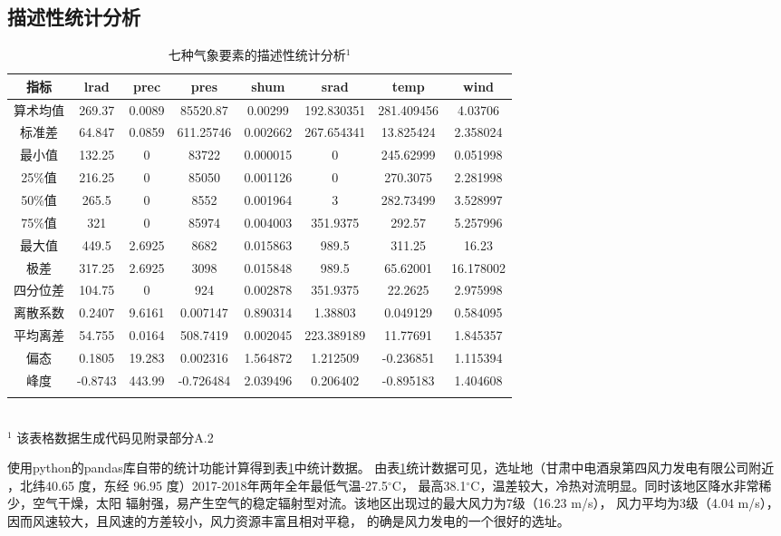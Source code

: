 \documentclass[AutoFakeBold]{LZUThesis}
\begin{document}
\subsection{描述性统计分析}

\begin{table}[H]
    \centering
    \caption{七种气象要素的描述性统计分析$^1$}
    \begin{tabular}{cccccccc}
    \toprule
    指标 & lrad & prec & pres & shum & srad & temp & wind \\
    \midrule
    算术均值 & 269.37 & 0.0089 & 85520.87 & 0.00299 & 192.830351 & 281.409456 & 4.03706 \\
    标准差 & 64.847 & 0.0859 & 611.25746 & 0.002662 & 267.654341 & 13.825424 & 2.358024 \\
    最小值 & 132.25 & 0 & 83722 & 0.000015 & 0 & 245.62999 & 0.051998 \\
    25\%值 & 216.25 & 0 & 85050 & 0.001126 & 0 & 270.3075 & 2.281998 \\
    50\%值 & 265.5 & 0 & 8552 & 0.001964 & 3 & 282.73499 & 3.528997 \\
    75\%值 & 321 & 0 & 85974 & 0.004003 & 351.9375 & 292.57 & 5.257996 \\
    最大值 & 449.5 & 2.6925 & 8682 & 0.015863 & 989.5 & 311.25 & 16.23 \\
    极差 & 317.25 & 2.6925 & 3098 & 0.015848 & 989.5 & 65.62001 & 16.178002 \\
    四分位差 & 104.75 & 0 & 924 & 0.002878 & 351.9375 & 22.2625 & 2.975998 \\
    离散系数 & 0.2407 & 9.6161 & 0.007147 & 0.890314 & 1.38803 & 0.049129 & 0.584095 \\
    平均离差 & 54.755 & 0.0164 & 508.7419 & 0.002045 & 223.389189 & 11.77691 & 1.845357 \\
    偏态 & 0.1805 & 19.283 & 0.002316 & 1.564872 & 1.212509 & -0.236851 & 1.115394 \\
    峰度 & -0.8743 & 443.99 & -0.726484 & 2.039496 & 0.206402 & -0.895183 & 1.404608 \\
    \bottomrule \\
    \end{tabular} \\
    \footnotesize{$^1$ 该表格数据生成代码见附录部分A.2} \\
    \label{analysis}
\end{table}

使用python的pandas库自带的统计功能计算得到表\ref{analysis}中统计数据。
由表\ref{analysis}统计数据可见，选址地（甘肃中电酒泉第四风力发电有限公司附近
，北纬40.65 度，东经 96.95 度）2017-2018年两年全年最低气温-27.5$^{\circ}$C，
最高38.1$^{\circ}$C，温差较大，冷热对流明显。同时该地区降水非常稀少，空气干燥，太阳
辐射强，易产生空气的稳定辐射型对流。该地区出现过的最大风力为7级（16.23 m/s），
风力平均为3级（4.04 m/s），因而风速较大，且风速的方差较小，风力资源丰富且相对平稳，
的确是风力发电的一个很好的选址。
\end{document}
